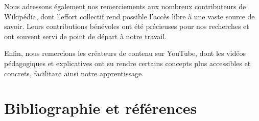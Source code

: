 \documentclass[12pt]{article}
\begin{document}
Nous adressons également nos remerciements aux nombreux contributeurs de Wikipédia, dont l’effort collectif rend possible l’accès libre à une vaste source de savoir. Leurs contributions bénévoles ont été précieuses pour nos recherches et ont souvent servi de point de départ à notre travail.

Enfin, nous remercions les créateurs de contenu sur YouTube, dont les vidéos pédagogiques et explicatives ont su rendre certains concepts plus accessibles et concrets, facilitant ainsi notre apprentissage.
\newpage
\section{Bibliographie et références}


\end{document}
